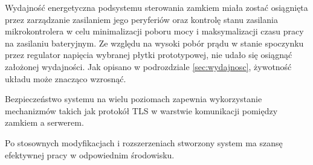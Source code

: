         Wydajność energetyczna podsystemu sterowania zamkiem miała zostać osiągnięta przez zarządzanie zasilaniem jego peryferiów oraz kontrolę stanu zasilania mikrokontrolera w celu minimalizacji poboru mocy i maksymalizacji czasu pracy na zasilaniu bateryjnym. Ze względu na wysoki pobór prądu w stanie spoczynku przez regulator napięcia wybranej płytki prototypowej, nie udało się osiągnąć założonej wydajności. Jak opisano w podrozdziale \ref{sec:wydajnosc}, żywotność układu może znacząco wzrosnąć.

        Bezpieczeństwo systemu na wielu poziomach zapewnia wykorzystanie mechanizmów takich jak protokół TLS w warstwie komunikacji pomiędzy zamkiem a serwerem.

        Po stosownych modyfikacjach i rozszerzeniach stworzony system ma szansę efektywnej pracy w odpowiednim środowisku.